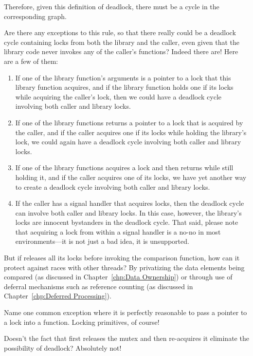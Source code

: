 \begin{enumerate}
	Therefore, given this definition of deadlock, there must
	be a cycle in the corresponding graph.

\QuickQ{}
	Are there any exceptions to this rule, so that there really could be
	a deadlock cycle containing locks from both the library and
	the caller, even given that the library code never invokes
	any of the caller's functions?
\QuickA{}
	Indeed there are!
	Here are a few of them:
	\begin{enumerate}
	\item	If one of the library function's arguments is a pointer
		to a lock that this library function acquires, and if
		the library function holds one if its locks while
		acquiring the caller's lock, then we could have a
		deadlock cycle involving both caller and library locks.
	\item	If one of the library functions returns a pointer to
		a lock that is acquired by the caller, and if the
		caller acquires one if its locks while holding the
		library's lock, we could again have a deadlock
		cycle involving both caller and library locks.
	\item	If one of the library functions acquires a lock and
		then returns while still holding it, and if the caller
		acquires one of its locks, we have yet another way
		to create a deadlock cycle involving both caller
		and library locks.
	\item	If the caller has a signal handler that acquires
		locks, then the deadlock cycle can involve both
		caller and library locks.
		In this case, however, the library's locks are
		innocent bystanders in the deadlock cycle.
		That said, please note that acquiring a lock from
		within a signal handler is a no-no in most
		environments---it is not just a bad idea, it
		is unsupported.
	\end{enumerate}

\QuickQ{}
	But if  releases all its locks before invoking
	the comparison function, how can it protect against races
	with other  threads?
\QuickA{}
	By privatizing the data elements being compared
	(as discussed in Chapter~\ref{chp:Data Ownership})
	or through use of deferral mechanisms such as
	reference counting (as discussed in
	Chapter~\ref{chp:Deferred Processing}).

\QuickQ{}
	Name one common exception where it is perfectly reasonable
	to pass a pointer to a lock into a function.
\QuickA{}
	Locking primitives, of course!

\QuickQ{}
	Doesn't the fact that  first releases the
	mutex and then re-acquires it eliminate the possibility of deadlock?
\QuickA{}
	Absolutely not!


\end{enumerate}
